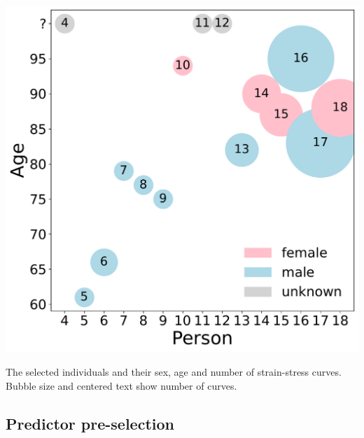 \begin{marginfigure}
    \centering
    \includegraphics[width=\linewidth]{skinstression/images/age_distribution.pdf}
    \caption[Source of data]{
        The selected individuals and their sex, age and number of strain-stress curves.
        Bubble size and centered text show number of curves.
    }
    \label{fig:source_of_data}
\end{marginfigure}

\subsection{Predictor pre-selection}

